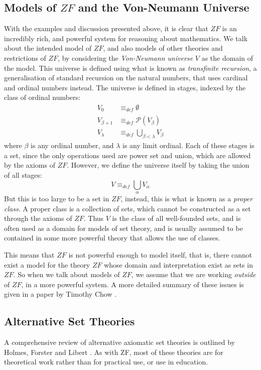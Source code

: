 \documentclass[11pt]{article}
\newcommand{\eqdef}{\equiv_\mathit{def}}
\theoremstyle{definition}
\theoremstyle{theorem}
\theoremstyle{lemma}
\begin{document}
\subsection{Models of $\mathit{ZF}$ and the Von-Neumann Universe}
With the examples and discussion presented above, it is clear that $\mathit{ZF}$ is an incredibly rich, and powerful system for reasoning about mathematics.
We talk about the intended model of $\mathit{ZF}$, and also models of other theories and restrictions of $ZF$, by considering the \emph{Von-Neumann universe} $V$ as the domain of the model. This universe is defined using what is known as \emph{transfinite recursion}, a generalisation of standard recursion on the natural numbers, that uses cardinal and ordinal numbers instead. The universe is defined in stages, indexed by the class of ordinal numbers:
\begin{align*}
  V_0 &\eqdef \emptyset \\
  V_{\beta+1} &\eqdef \mathcal{P}(V_\beta)\\
  V_{\lambda} &\eqdef \bigcup_{\beta<\lambda} V_\beta
\end{align*}
where $\beta$ is any ordinal number, and $\lambda$ is any limit ordinal.
Each of these stages is a set, since the only operations used are power set and union, which are allowed by the axioms of $\mathit{ZF}$. However, we define the universe itself by taking the union of all stages:
$$V \eqdef \bigcup_\alpha V_\alpha$$
But this is too large to be a set in $\mathit{ZF}$, instead, this is what is known as a \emph{proper class}.
A proper class is a collection of sets, which cannot be constructed as a set through the axioms of $\mathit{ZF}$.
Thus $V$ is the class of all well-founded sets, and is often used as a domain for models of set theory, and is usually assumed to be contained in some more powerful theory that allows the use of classes.

This means that $\mathit{ZF}$ is not powerful enough to model itself, that is, there cannot exist a model for the theory $\mathit{ZF}$ whose domain and interpretation exist as sets in $\mathit{ZF}$.
So when we talk about models of $ZF$, we assume that we are working \emph{outside} of $\mathit{ZF}$, in a more powerful system. A more detailed summary of these issues is given in a paper by Timothy Chow \cite{force}.

\subsection{Alternative Set Theories}
A comprehensive review of alternative axiomatic set theories is outlined by Holmes, Forster and Libert \cite{ast}.
As with ZF, most of these theories are for theoretical work rather than for practical use, or use in education.
\end{document}
